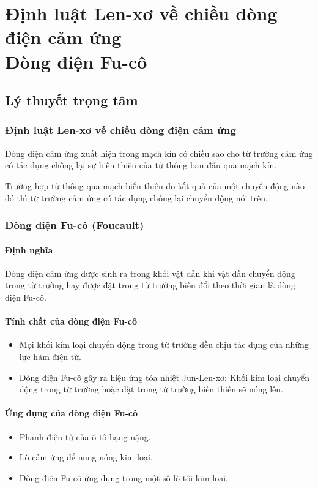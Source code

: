 \chapter[Định luật Len-xơ về chiều dòng điện cảm ứng - Dòng điện Fu-cô]{Định luật Len-xơ về chiều dòng điện cảm ứng \\ Dòng điện Fu-cô}
\section{Lý thuyết trọng tâm}
\subsection{Định luật Len-xơ về chiều dòng điện cảm ứng }
Dòng điện cảm ứng xuất hiện trong mạch kín có chiều sao cho từ trường cảm ứng có tác dụng chống lại sự biến thiên của từ thông ban đầu qua mạch kín.

Trường hợp từ thông qua mạch biến thiên do kết quả của một chuyển động nào đó thì từ trường cảm ứng có tác dụng chống lại chuyển động nói trên. 

\subsection{Dòng điện Fu-cô (Foucault)}
\subsubsection{Định nghĩa}
Dòng điện cảm ứng được sinh ra trong khối vật dẫn khi vật dẫn chuyển động trong từ trường hay được đặt trong từ trường biến đổi theo thời gian là dòng điện Fu-cô.
\subsubsection{Tính chất của dòng điện Fu-cô}

\begin{itemize}
	\item Mọi khối kim loại chuyển động trong từ trường đều chịu tác dụng của những lực hãm điện từ. 
	\item Dòng điện Fu-cô gây ra hiệu ứng tỏa nhiệt Jun-Len-xơ: Khối kim loại chuyển động trong từ trường hoặc đặt trong từ trường biến thiên sẽ nóng lên. 
	\end{itemize}
\subsubsection{Ứng dụng của dòng điện Fu-cô}
\begin{itemize}
	\item Phanh điện từ của ô tô hạng nặng. 
	\item Lò cảm ứng để nung nóng kim loại.
	\item Dòng điện Fu-cô ứng dụng trong một số lò tôi kim loại.
\end{itemize}

